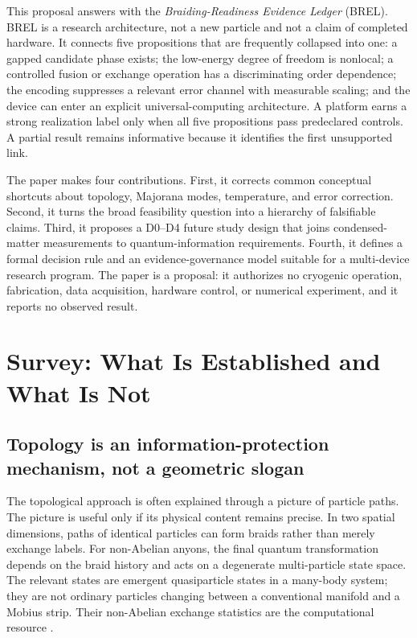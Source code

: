 \documentclass[conference]{IEEEtran}
\newcommand{\BREL}{\textsc{BREL}}
\begin{document}
This proposal answers with the \emph{Braiding-Readiness Evidence Ledger} (\BREL). BREL is a research architecture, not a new particle and not a claim of completed hardware. It connects five propositions that are frequently collapsed into one: a gapped candidate phase exists; the low-energy degree of freedom is nonlocal; a controlled fusion or exchange operation has a discriminating order dependence; the encoding suppresses a relevant error channel with measurable scaling; and the device can enter an explicit universal-computing architecture. A platform earns a strong realization label only when all five propositions pass predeclared controls. A partial result remains informative because it identifies the first unsupported link.

The paper makes four contributions. First, it corrects common conceptual shortcuts about topology, Majorana modes, temperature, and error correction. Second, it turns the broad feasibility question into a hierarchy of falsifiable claims. Third, it proposes a D0--D4 future study design that joins condensed-matter measurements to quantum-information requirements. Fourth, it defines a formal decision rule and an evidence-governance model suitable for a multi-device research program. The paper is a proposal: it authorizes no cryogenic operation, fabrication, data acquisition, hardware control, or numerical experiment, and it reports no observed result.

\section{Survey: What Is Established and What Is Not}

\subsection{Topology is an information-protection mechanism, not a geometric slogan}

The topological approach is often explained through a picture of particle paths. The picture is useful only if its physical content remains precise. In two spatial dimensions, paths of identical particles can form braids rather than merely exchange labels. For non-Abelian anyons, the final quantum transformation depends on the braid history and acts on a degenerate multi-particle state space. The relevant states are emergent quasiparticle states in a many-body system; they are not ordinary particles changing between a conventional manifold and a Mobius strip. Their non-Abelian exchange statistics are the computational resource \cite{nayak2008}.
\end{document}
